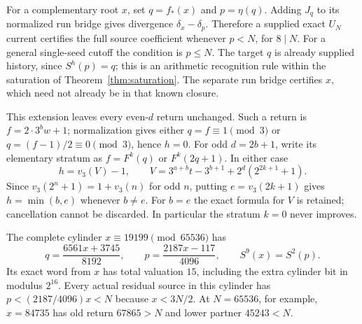 \documentclass[11pt]{article}
\begin{document}
For a complementary root $x$, set $q=f_*(x)$ and $p=\eta(q)$.
Adding $J_q$ to its normalized run bridge gives divergence
$\delta_x-\delta_p$. Therefore a supplied exact $U_N$ current
certifies the full source coefficient whenever $p<N$, for $8\mid N$.
For a general single-seed cutoff the condition is $p\le N$.
The target $q$ is already supplied history, since $S^h(p)=q$;
this is an arithmetic recognition rule within the saturation of
Theorem~\ref{thm:saturation}. The separate run bridge certifies $x$,
which need not already be in that known closure.

This extension leaves every even-$d$ return unchanged. Such a return
is $f=2\cdot3^b w+1$; normalization gives either $q=f\equiv1\pmod3$
or $q=(f-1)/2\equiv0\pmod3$, hence $h=0$.
For odd $d=2b+1$, write its elementary stratum as
$f=F^k(q)$ or $F^k(2q+1)$. In either case
\[
h=v_3(V)-1,\qquad
V=3^{a+b}t-3^{b+1}+2^d(2^{2k+1}+1).
\]
Since $v_3(2^n+1)=1+v_3(n)$ for odd $n$, putting
$e=v_3(2k+1)$ gives $h=\min(b,e)$ whenever $b\ne e$.
For $b=e$ the exact formula for $V$ is retained; cancellation cannot
be discarded. In particular the stratum $k=0$ never improves.

The complete cylinder $x\equiv19199\pmod{65536}$ has
\[
q=\frac{6561x+3745}{8192},\qquad
p=\frac{2187x-117}{4096},\qquad S^9(x)=S^2(p).
\]
Its exact word from $x$ has total valuation $15$, including the extra
cylinder bit in modulus $2^{16}$. Every actual residual source in
this cylinder has $p<(2187/4096)x<N$ because $x<3N/2$.
At $N=65536$, for example, $x=84735$ has old return $67865>N$
and lower partner $45243<N$.
\end{document}
